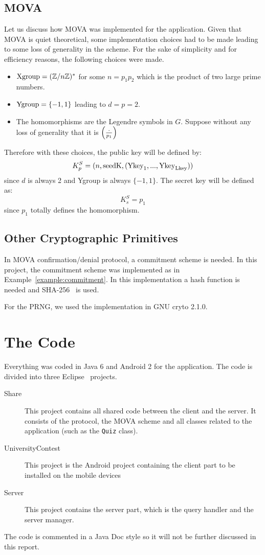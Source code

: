     \subsection{MOVA}
    Let us discuss how MOVA was implemented for the application. Given that MOVA is quiet theoretical, some implementation choices had to be made leading to some loss of generality 
    in the scheme.
    For the sake of simplicity and for efficiency reasons, the following choices were made.
    \begin{itemize}[label=,leftmargin=0.8cm,rightmargin=1cm]
        \item $\mathrm{Xgroup} = (\mathbb{Z}/n\mathbb{Z})^*$ for some $n=p_1 p_2$ which is the product of two large prime numbers. 
        \item $\mathrm{Ygroup} = \{-1,1\}$ leading to $d=p=2$.
        \item The homomorphisms are the Legendre symbols in $G$. Suppose without any 
            loss of generality that it is $\left(\frac{\cdot}{p_1}\right)$
    \end{itemize}

    \noindent Therefore with these choices, the public key will be defined by:
    \[
        K_p^{S} = (n,\mathrm{seedK},(\mathrm{Ykey}_{1},...,\mathrm{Ykey}_{\mathrm{Lkey}}))
    \]
    since $d$ is always 2 and Ygroup is always $\{-1,1\}$. The secret key will be defined as:
    \[
        K_s^{S} = p_1
    \]
    since $p_1$ totally defines the homomorphism.

    \subsection{Other Cryptographic Primitives}
    In MOVA confirmation/denial protocol, a commitment scheme is needed. In this project, the commitment scheme was implemented
    as in Example~\ref{example:commitment}. In this implementation a hash function is needed and SHA-256~\cite{nist:sha} 
    is used. 

    For the PRNG, we used the implementation in GNU cryto 2.1.0\cite{cite:gnu-crypto}.

    \section{The Code}
    Everything was coded in Java 6 and Android 2 for the application. The code is divided into three Eclipse~\cite{eclipse} projects.
    \begin{description}
        \item[Share] This project contains all shared code between the client and the server. It consists of the protocol,
            the MOVA scheme and all classes related to the application (such as the \texttt{Quiz} class).
        \item[UniversityContest] This project is the Android project containing the client part to be installed on the mobile
            devices
        \item[Server] This project contains the server part, which is the query handler and the server manager.
    \end{description}

    The code is commented in a Java Doc style so it will not be further discussed in this report.


